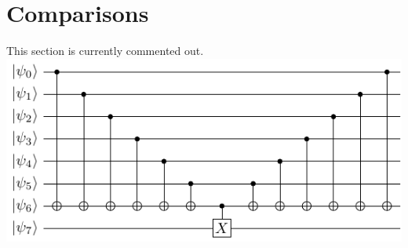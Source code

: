 \documentclass[a4paper,twocolumn,11pt,accepted=2017-05-09]{quantumarticle}
\begin{document}
 \section{Comparisons}
    This section is currently commented out.
    \includegraphics{../examples/diagrams/simu.pdf}
% 
% 
%  
%  
%  
%  
\end{document}
